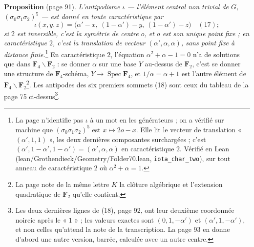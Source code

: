 \documentclass[11pt,a4paper]{article}
\begin{document}
\textbf{Proposition} (page 91). \emph{L'antipodisme $\iota$ --- l'élément central
non trivial de $G$, $(\sigma_0\sigma_1\sigma_2)^5$ --- est donné en toute
caractéristique par}
\[
\iota(x, y, z) = \bigl(\alpha' - x,\ (1 - \alpha') - y,\ (1 - \alpha') - z\bigr)
\quad (17) ;
\]
\emph{si $2$ est inversible, c'est la symétrie de centre $o$, et $o$ est son
unique point fixe ; en caractéristique $2$, c'est la translation de vecteur
$(\alpha', \alpha, \alpha)$, sans point fixe à distance finie.}\footnote{La
page n'identifie pas $\iota$ à un mot en les générateurs ; on a vérifié sur
machine que $(\sigma_0\sigma_1\sigma_2)^5$ est $x \mapsto 2o - x$. Elle lit le
vecteur de translation « $(\alpha', 1, 1)$ », les deux dernières composantes
surchargées ; c'est $(\alpha', 1 - \alpha', 1 - \alpha') = (\alpha', \alpha,
\alpha)$ en caractéristique $2$. Vérifié en Lean
(lean/Grothendieck/Geometry/Folder70.lean, \texttt{iota\_char\_two}), sur tout anneau
de caractéristique $2$ où $\alpha^2 + \alpha = 1$.} En caractéristique $2$, l'équation $\alpha^2 +
\alpha - 1 = 0$ n'a de solutions que dans $\mathbf{F}_4 \smallsetminus
\mathbf{F}_2$ : se donner $\alpha$ sur une base $Y$ au-dessus de $\mathbf{F}_2$,
c'est se donner une structure de $\mathbf{F}_4$-schéma, $Y \to \operatorname{Spec}
\mathbf{F}_4$, et $1/\alpha = \alpha + 1$ est l'autre élément de $\mathbf{F}_4
\smallsetminus \mathbf{F}_2$\footnote{La page note de la même lettre $K$ la
clôture algébrique et l'extension quadratique de $\mathbf{F}_2$ qu'elle
contient.}. Les antipodes des six premiers sommets (18) sont ceux du tableau
de la page 75 ci-dessus\footnote{Les deux dernières lignes de (18), page 92,
ont leur deuxième coordonnée noircie après le « $1$ » ; les valeurs exactes
sont $(0, 1, -\alpha')$ et $(\alpha', 1, -\alpha')$, et non celles qu'attend la
note de la transcription. La page 93 en donne d'abord une autre version,
barrée, calculée avec un autre centre.}.
\end{document}

